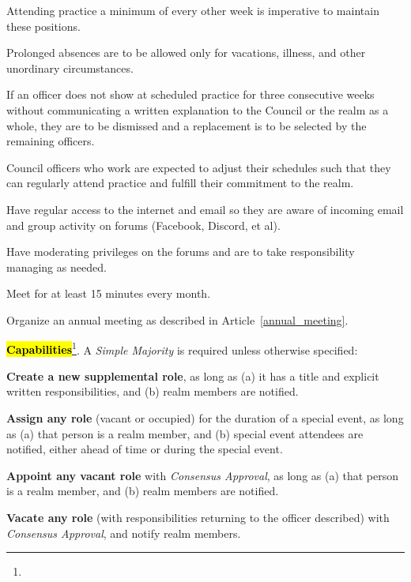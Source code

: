 \documentclass[12pt]{article}
\newcommand{\newpart}[2][]{\hl{#2}\expandafter\ifx\expandafter\relax\detokenize{#1}\relax\else\textnormal{\footnote{#1}}\fi}
\begin{document}
\begin{level}
\begin{level}
\begin{level}
            \begin{level}
                \item Attending practice a minimum of every other week is imperative to maintain these positions. 
                \item Prolonged absences are to be allowed only for vacations, illness, and other unordinary circumstances. 
                \item If an officer does not show at scheduled practice for three consecutive weeks without communicating a written explanation to the Council or the realm as a whole, they are to be dismissed and a replacement is to be selected by the remaining officers. 
                \item Council officers who work are expected to adjust their schedules such that they can regularly attend practice and fulfill their commitment to the realm.
            \end{level}   
            \item Have regular access to the internet and email so they are aware of incoming email and group activity on forums (Facebook, Discord, et al).
            \item Have moderating privileges on the forums and are to take responsibility managing as needed.
            \item Meet for at least 15 minutes every month.
            \item Organize an annual meeting as described in Article~\ref{annual_meeting}.
        \end{level}
        \item \newpart{\textbf{Capabilities}}. A \emph{Simple Majority} is required unless otherwise specified:
        \begin{level}
            \item \textbf{Create a new supplemental role}, as long as (a) it has a title and explicit written responsibilities, and (b) realm members are notified.
            \item \textbf{Assign any role} (vacant or occupied) for the duration of a special event, as long as (a) that person is a realm member, and (b) special event attendees are notified, either ahead of time or during the special event.\label{temp_role}
            \item \textbf{Appoint any vacant role} with \emph{Consensus Approval}, as long as (a) that person is a realm member, and (b) realm members are notified.
            \item \textbf{Vacate any role} (with responsibilities returning to the officer described) with \emph{Consensus Approval}, and notify realm members.

\end{level}
\end{level}
\end{level}
\end{document}
